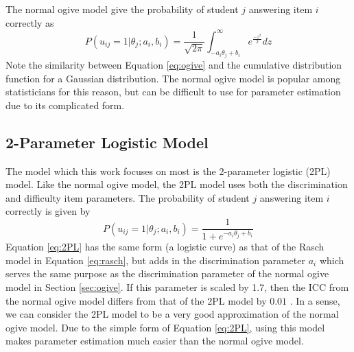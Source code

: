 The normal ogive model give the probability of student $j$ answering item $i$ correctly as
\begin{equation}
  P(u_{ij} = 1 | \theta_j; a_i, b_i) = \frac{1}{\sqrt{2\pi}} \int_{-a_i \theta_j + b_i}^\infty e^{\frac{-z^{2}}{2}}dz
  \label{eq:ogive}
\end{equation}
Note the similarity between Equation \ref{eq:ogive} and the cumulative distribution function for a Gaussian distribution. The normal ogive model is popular among statisticians for this reason, but can be difficult to use for parameter estimation due to its complicated form.

\subsection{2-Parameter Logistic Model}
The model which this work focuses on most is the 2-parameter logistic (2PL) model. Like the normal ogive model, the 2PL model uses both the discrimination and difficulty item parameters. The probability of student $j$ answering item $i$ correctly is given by
\begin{equation}
  P(u_{ij} = 1 | \theta_j; a_i, b_i) = \frac{1}{1 + e^{-a_i \theta_j + b_i}}
  \label{eq:2PL}
\end{equation}
Equation \ref{eq:2PL} has the same form (a logistic curve) as that of the Rasch model in Equation \ref{eq:rasch}, but adds in the discrimination parameter $a_i$ which serves the same purpose as the discrimination parameter of the normal ogive model in Section \ref{sec:ogive}. If this parameter is scaled by 1.7, then the ICC from the normal ogive model differs from that of the 2PL model by $0.01$ \cite{baker_kim2004}. In a sense, we can consider the 2PL model to be a very good approximation of the normal ogive model. Due to the simple form of Equation \ref{eq:2PL}, using this model makes parameter estimation much easier than the normal ogive model.

